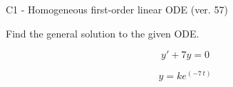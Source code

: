 \begin{exercise}
  \begin{exerciseTitle}C1 - Homogeneous first-order linear ODE (ver. 57)\end{exerciseTitle}
  \begin{exerciseStatement}
    
Find the general solution to the given ODE.

    
\[y'+7y=0\]

  \end{exerciseStatement}
  \begin{exerciseAnswer}
    
\[y= k e^{\left(-7 \, t\right)}\]

  \end{exerciseAnswer}
\end{exercise}